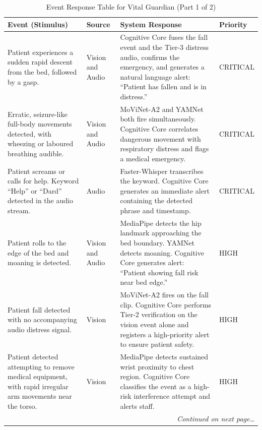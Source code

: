 \begin{table}[H]
    \centering
    \caption{Event Response Table for Vital Guardian (Part 1 of 2)}
    \label{tab:event_response}
    \renewcommand{\arraystretch}{1.4}
    \begin{tabular}{|p{3.8cm}|p{2cm}|p{5.2cm}|p{1.8cm}|}
    \hline
    \textbf{Event (Stimulus)} & \textbf{Source} & \textbf{System Response} & \textbf{Priority} \\ \hline

    Patient experiences a sudden rapid descent from the bed, followed by a gasp. &
    Vision and Audio &
    Cognitive Core fuses the fall event and the Tier-3 distress audio, confirms
    the emergency, and generates a natural language alert: ``Patient has fallen
    and is in distress.'' &
    CRITICAL \\ \hline

    Erratic, seizure-like full-body movements detected, with wheezing or
    laboured breathing audible. &
    Vision and Audio &
    MoViNet-A2 and YAMNet both fire simultaneously. Cognitive Core correlates
    dangerous movement with respiratory distress and flags a medical emergency. &
    CRITICAL \\ \hline

    Patient screams or calls for help. Keyword ``Help'' or ``Dard'' detected in
    the audio stream. &
    Audio &
    Faster-Whisper transcribes the keyword. Cognitive Core generates an
    immediate alert containing the detected phrase and timestamp. &
    CRITICAL \\ \hline

    Patient rolls to the edge of the bed and moaning is detected. &
    Vision and Audio &
    MediaPipe detects the hip landmark approaching the bed boundary.
    YAMNet detects moaning. Cognitive Core generates alert:
    ``Patient showing fall risk near bed edge.'' &
    HIGH \\ \hline

    Patient fall detected with no accompanying audio distress signal. &
    Vision &
    MoViNet-A2 fires on the fall clip. Cognitive Core performs Tier-2
    verification on the vision event alone and registers a high-priority alert
    to ensure patient safety. &
    HIGH \\ \hline

    Patient detected attempting to remove medical equipment, with rapid
    irregular arm movements near the torso. &
    Vision &
    MediaPipe detects sustained wrist proximity to chest region. Cognitive Core
    classifies the event as a high-risk interference attempt and alerts staff. &
    HIGH \\ \hline

    \multicolumn{4}{r}{\small\textit{Continued on next page\ldots}} \\
    \end{tabular}
\end{table}

